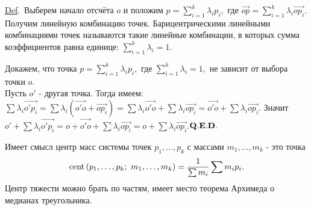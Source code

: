 \documentclass[draft]{article}%
\newcommand{\de}{\par\noindent\underline{Def}.\ }%
\newcommand{\ab}{\par\noindent}%
\newcommand{\qed}{\quad${{\bf Q.E.D.}}$}
\newcommand{\rom}[1]{{\rm#1\,}}
\newcommand{\oi}[1]{\overrightarrow{#1}}%
\begin{document}
\de Выберем начало отсчёта $o$ и положим $p=\sum\limits_{i=1}^k\lambda_ip_i,$ где
$\oi{op}=\sum\limits_{i=1}^k\lambda_i\oi{op_i}.$ Получим линейную комбинацию точек. Барицентрическими
линейными комбинациями точек называются такие линейные комбинации, в которых сумма коэффициентов равна единице:
$\sum\limits_{i=1}^k\lambda_i=1.$ %
\ab Докажем, что точка $p=\sum\limits_{i=1}^k\lambda_ip_i,$ где $\sum\limits_{i=1}^k\lambda_i=1,$ не зависит от
выбора точки $o$.\\ Пусть $o'$ - другая точка. Тогда имеем: \
$\sum\lambda_i\oi{o'p_i}=\sum\lambda_i(\oi{o'o}+\oi{op_i})=\sum\lambda_i\oi{o'o}+\sum\lambda_i\oi{op_i}=\oi{o'o}+\sum\lambda_i\oi{op_i}.$
Значит\ \  $o'+\sum\lambda_i\oi{o'p_i}=o+\oi{o'o}+\sum\lambda_i\oi{op_i}=o+\sum\lambda_i\oi{op_i}.$\qquad\qed %
\ab Имеет смысл центр масс системы точек $p_1,\dots,p_k$ с массами $m_1,\dots,m_k$ - это точка
$$
\rom{cent}(p_1,\dots,p_k;\ m_1,\dots,m_k)=\frac{1}{\sum m_i}\sum m_ip_i.
$$
Центр тяжести можно брать по частям, имеет место теорема Архимеда о медианах треугольника.
\end{document}

